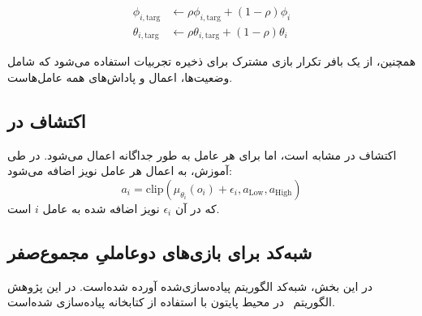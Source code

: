 \begin{align*}
    \phi_{i,\text{targ}} &\leftarrow \rho \phi_{i,\text{targ}} + (1 - \rho) \phi_i \\
    \theta_{i,\text{targ}} &\leftarrow \rho \theta_{i,\text{targ}} + (1 - \rho) \theta_i
\end{align*}

همچنین، از یک بافر تکرار بازی مشترک برای ذخیره تجربیات استفاده می‌شود که شامل وضعیت‌ها، اعمال و پاداش‌های همه عامل‌هاست.

\subsection{اکتشاف در }

اکتشاف در  مشابه  است، اما برای هر عامل به طور جداگانه اعمال می‌شود. در طی آموزش، به اعمال هر عامل نویز اضافه می‌شود:
\begin{equation}
    a_i = \text{clip}(\mu_{\theta_i}(o_i) + \epsilon_i, a_{\text{Low}}, a_{\text{High}})
\end{equation}
که در آن $\epsilon_i$ نویز اضافه شده به عامل $i$ است.
\subsection{شبه‌کد  برای بازی‌های دو­عاملیِ مجموع­‌صفر}
       در این بخش، شبه‌کد الگوریتم
پیاده‌سازی‌شده آورده شده‌است. در این پژوهش الگوریتم~ در محیط پایتون با استفاده از کتابخانه
 \cite{paszke2017automatic}
پیاده‌سازی شده‌است.

